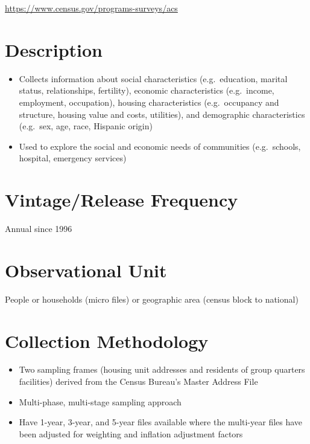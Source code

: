 \documentclass[
]{book}
\providecommand{\tightlist}{%
  \setlength{\itemsep}{0pt}\setlength{\parskip}{0pt}}
\begin{document}
\url{https://www.census.gov/programs-surveys/acs}

\hypertarget{description-4}{%
\section{Description}\label{description-4}}

\begin{itemize}
\tightlist
\item
  Collects information about social characteristics (e.g.~education, marital status, relationships, fertility), economic characteristics (e.g.~income, employment, occupation), housing characteristics (e.g.~occupancy and structure, housing value and costs, utilities), and demographic characteristics (e.g.~sex, age, race, Hispanic origin)
\item
  Used to explore the social and economic needs of communities (e.g.~schools, hospital, emergency services)
\end{itemize}

\hypertarget{vintagerelease-frequency-4}{%
\section{Vintage/Release Frequency}\label{vintagerelease-frequency-4}}

Annual since 1996

\hypertarget{observational-unit-4}{%
\section{Observational Unit}\label{observational-unit-4}}

People or households (micro files) or geographic area (census block to national)

\hypertarget{collection-methodology-4}{%
\section{Collection Methodology}\label{collection-methodology-4}}

\begin{itemize}
\tightlist
\item
  Two sampling frames (housing unit addresses and residents of group quarters facilities) derived from the Census Bureau's Master Address File
\item
  Multi-phase, multi-stage sampling approach
\item
  Have 1-year, 3-year, and 5-year files available where the multi-year files have been adjusted for weighting and inflation adjustment factors
\end{itemize}
\end{document}
